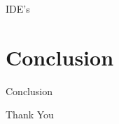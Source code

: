\documentclass{beamer}
\begin{document}
            \begin{frame}{IDE's}
            \end{frame}

    \section*{Conclusion}

            \begin{frame}{Conclusion}
            \end{frame}

            \begin{frame}{Thank You}
            \end{frame}
\end{document}
